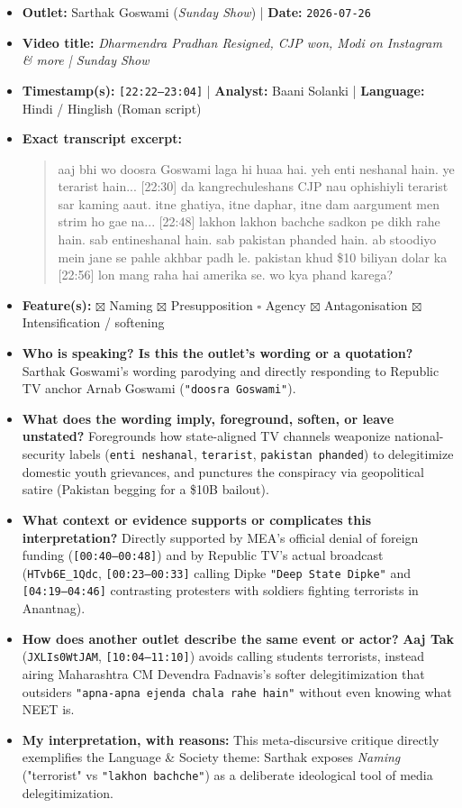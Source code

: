 \documentclass[10pt,a4paper]{article}
\begin{document}
\begin{itemize}[leftmargin=1.5em, itemsep=3pt, topsep=4pt]
  \item \textbf{Outlet:} Sarthak Goswami (\textit{Sunday Show}) | \textbf{Date:} \texttt{2026-07-26}
  \item \textbf{Video title:} \textit{Dharmendra Pradhan Resigned, CJP won, Modi on Instagram \& more | Sunday Show}
  \item \textbf{Timestamp(s):} \texttt{[22:22--23:04]} | \textbf{Analyst:} Baani Solanki | \textbf{Language:} Hindi / Hinglish (Roman script)
  \item \textbf{Exact transcript excerpt:}
    \begin{quote}\small\ttfamily [22:22] aaj bhi wo doosra Goswami laga hi huaa hai. yeh enti neshanal hain. ye terarist hain... [22:30] da kangrechuleshans CJP nau ophishiyli terarist sar kaming aaut. itne ghatiya, itne daphar, itne dam aargument men strim ho gae na... [22:48] lakhon lakhon bachche sadkon pe dikh rahe hain. sab entineshanal hain. sab pakistan phanded hain. ab stoodiyo mein jane se pahle akhbar padh le. pakistan khud \$10 biliyan dolar ka [22:56] lon mang raha hai amerika se. wo kya phand karega?\end{quote}
  \item \textbf{Feature(s):} $\boxtimes$ Naming $\boxtimes$ Presupposition $\square$ Agency $\boxtimes$ Antagonisation $\boxtimes$ Intensification / softening
  \item \textbf{Who is speaking? Is this the outlet's wording or a quotation?} Sarthak Goswami's wording parodying and directly responding to Republic TV anchor Arnab Goswami (\texttt{"doosra Goswami"}).
  \item \textbf{What does the wording imply, foreground, soften, or leave unstated?} Foregrounds how state-aligned TV channels weaponize national-security labels (\texttt{enti neshanal}, \texttt{terarist}, \texttt{pakistan phanded}) to delegitimize domestic youth grievances, and punctures the conspiracy via geopolitical satire (Pakistan begging for a \$10B bailout).
  \item \textbf{What context or evidence supports or complicates this interpretation?} Directly supported by MEA's official denial of foreign funding (\texttt{[00:40--00:48]}) and by Republic TV's actual broadcast (\texttt{HTvb6E\_1Qdc}, \texttt{[00:23--00:33]} calling Dipke \texttt{"Deep State Dipke"} and \texttt{[04:19--04:46]} contrasting protesters with soldiers fighting terrorists in Anantnag).
  \item \textbf{How does another outlet describe the same event or actor?} \textbf{Aaj Tak} (\texttt{JXLIs0WtJAM}, \texttt{[10:04--11:10]}) avoids calling students terrorists, instead airing Maharashtra CM Devendra Fadnavis's softer delegitimization that outsiders \texttt{"apna-apna ejenda chala rahe hain"} without even knowing what NEET is.
  \item \textbf{My interpretation, with reasons:} This meta-discursive critique directly exemplifies the Language \& Society theme: Sarthak exposes \textit{Naming} ("terrorist" vs \texttt{"lakhon bachche"}) as a deliberate ideological tool of media delegitimization.
\end{itemize}
\end{document}
